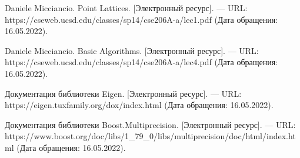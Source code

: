\newpage


\begin{thebibliography}{4}

Daniele Micciancio. Point Lattices. [Электронный ресурс]. --- URL: https://cseweb.ucsd.edu/classes/sp14/cse206A-a/lec1.pdf (Дата обращения: 16.05.2022).

Daniele Micciancio. Basic Algorithms. [Электронный ресурс]. --- URL: https://cseweb.ucsd.edu/classes/sp14/cse206A-a/lec4.pdf (Дата обращения: 16.05.2022).

Документация библиотеки Eigen. [Электронный ресурс]. --- URL: https://eigen.tuxfamily.org/dox/index.html (Дата обращения: 16.05.2022).

Документация библиотеки Boost.Multiprecision. [Электронный ресурс]. --- URL: https://www.boost.org/doc/libs/1\_79\_0/libs/multiprecision/doc/html/index.html (Дата обращения: 16.05.2022).

\end{thebibliography}

\clearpage